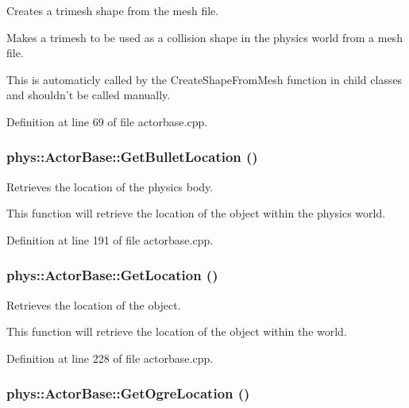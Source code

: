 Creates a trimesh shape from the mesh file. 

Makes a trimesh to be used as a collision shape in the physics world from a mesh file. \par
 This is automaticly called by the CreateShapeFromMesh function in child classes and shouldn't be called manually. 

Definition at line 69 of file actorbase.cpp.

\hypertarget{classphys_1_1ActorBase_ad543855adcc37dc9cdea4e264ca7953d}{
\subsubsection[{GetBulletLocation}]{ phys::ActorBase::GetBulletLocation ()}}
\label{d8/d0f/classphys_1_1ActorBase_ad543855adcc37dc9cdea4e264ca7953d}


Retrieves the location of the physics body. 

This function will retrieve the location of the object within the physics world. 

Definition at line 191 of file actorbase.cpp.

\hypertarget{classphys_1_1ActorBase_af554468ebd26c0e06301e52cb6fcfda8}{
\subsubsection[{GetLocation}]{ phys::ActorBase::GetLocation ()}}
\label{d8/d0f/classphys_1_1ActorBase_af554468ebd26c0e06301e52cb6fcfda8}


Retrieves the location of the object. 

This function will retrieve the location of the object within the world. 

Definition at line 228 of file actorbase.cpp.

\hypertarget{classphys_1_1ActorBase_a89642f74b0f2782f5f3bf1bed080939e}{
\subsubsection[{GetOgreLocation}]{ phys::ActorBase::GetOgreLocation ()}}
\label{d8/d0f/classphys_1_1ActorBase_a89642f74b0f2782f5f3bf1bed080939e}


